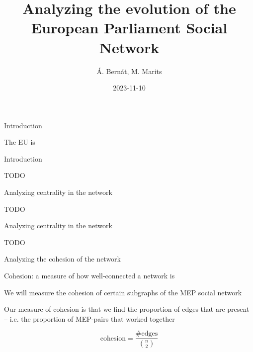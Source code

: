 \documentclass{beamer}
\title{Analyzing the evolution of the European Parliament Social Network}
\date{2023-11-10}
\author{Á. Bernát, M. Marits}
\begin{document}
\begin{frame}[plain]
    \maketitle
\end{frame}

\begin{frame}{Introduction}
	
	The EU is 
	
\end{frame}

\begin{frame}{Introduction}
	
	TODO
	
\end{frame}

\begin{frame}{Analyzing centrality in the network}
	
	TODO
	
\end{frame}

\begin{frame}{Analyzing centrality in the network}
	
	TODO
	
\end{frame}

\begin{frame}{Analyzing the cohesion of the network}
	
	Cohesion: a measure of how well-connected a network is
	
	\vspace{2mm}
	
	\pause We will measure the cohesion of certain subgraphs of the MEP social network
	
	\vspace{2mm}
	
	\pause Our measure of cohesion is that we find the proportion of edges that are present -- i.e. the proportion of MEP-pairs that worked together
	
	\pause \[
		\text{cohesion} = \frac{\#\text{edges}}{\binom{n}{2}}
	\]
	
\end{frame}
\end{document}
